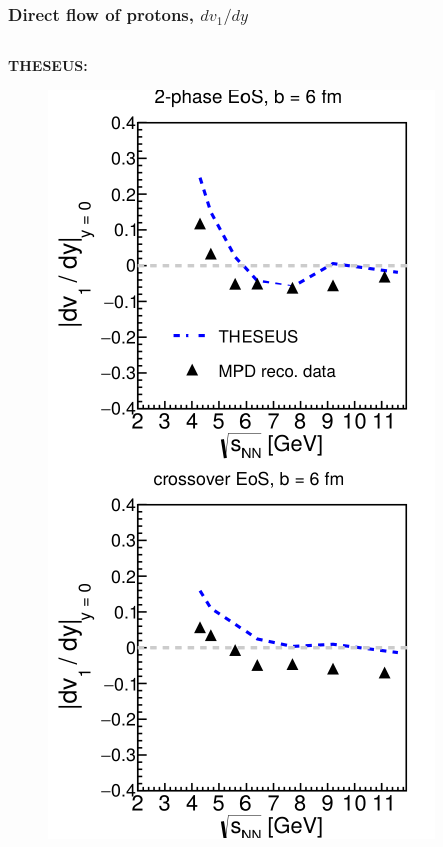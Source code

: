\documentclass[dvipsnames] {beamer}
\begin{document}
\begin{frame}[shrink=20]
  \frametitle{Direct flow of protons, $dv_{1} / dy$}
  \begin{columns}[c]
    \begin{block}{{\tiny \bf \centering THESEUS:}}
    \begin{figure}[H]
      \includegraphics[width=.99\textwidth]{slopeProtons_6fm_urqON.pdf}
    \end{figure}
    \end{block}


\end{columns}
\end{frame}
\end{document}
